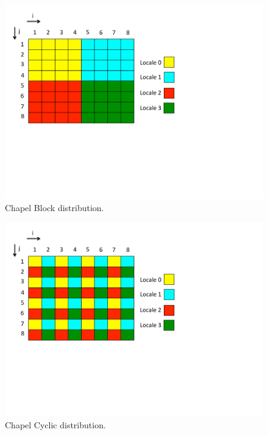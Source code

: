 \begin{figure}
\begin{center}
\includegraphics[scale=0.50]{./Figures/block_dist}
\caption{Chapel Block distribution.}
\label{block_dist}
\end{center}
\end{figure}

\begin{figure}
\begin{center}
\includegraphics[scale=0.50]{./Figures/cyc_dist}
\caption{Chapel Cyclic distribution.}
\label{cyc_dist}
\end{center}
\end{figure}

